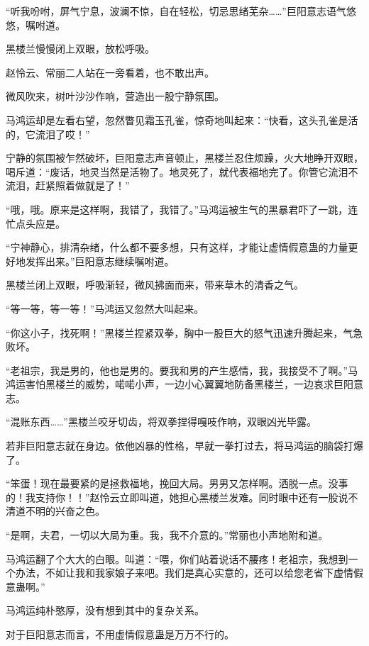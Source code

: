 
\begin{this_body}



“听我吩咐，屏气宁息，波澜不惊，自在轻松，切忌思绪芜杂……”巨阳意志语气悠悠，嘱咐道。

黑楼兰慢慢闭上双眼，放松呼吸。

赵怜云、常丽二人站在一旁看着，也不敢出声。

微风吹来，树叶沙沙作响，营造出一股宁静氛围。

马鸿运却是左看右望，忽然瞥见霜玉孔雀，惊奇地叫起来：“快看，这头孔雀是活的，它流泪了哎！”

宁静的氛围被乍然破坏，巨阳意志声音顿止，黑楼兰忍住烦躁，火大地睁开双眼，喝斥道：“废话，地灵当然是活物了。地灵死了，就代表福地完了。你管它流泪不流泪，赶紧照着做就是了！”

“哦，哦。原来是这样啊，我错了，我错了。”马鸿运被生气的黑暴君吓了一跳，连忙点头应是。

“宁神静心，排清杂绪，什么都不要多想，只有这样，才能让虚情假意蛊的力量更好地发挥出来。”巨阳意志继续嘱咐道。

黑楼兰闭上双眼，呼吸渐轻，微风拂面而来，带来草木的清香之气。

“等一等，等一等！”马鸿运又忽然大叫起来。

“你这小子，找死啊！”黑楼兰捏紧双拳，胸中一股巨大的怒气迅速升腾起来，气急败坏。

“老祖宗，我是男的，他也是男的。要我和男的产生感情，我，我接受不了啊。”马鸿运害怕黑楼兰的威势，喏喏小声，一边小心翼翼地防备黑楼兰，一边哀求巨阳意志。

“混账东西……”黑楼兰咬牙切齿，将双拳捏得嘎吱作响，双眼凶光毕露。

若非巨阳意志就在身边。依他凶暴的性格，早就一拳打过去，将马鸿运的脑袋打爆了。

“笨蛋！现在最要紧的是拯救福地，挽回大局。男男又怎样啊。洒脱一点。没事的！我支持你！！”赵怜云立即叫道，她担心黑楼兰发难。同时眼中还有一股说不清道不明的兴奋之色。

“是啊，夫君，一切以大局为重。我，我不介意的。”常丽也小声地附和道。

马鸿运翻了个大大的白眼。叫道：“喂，你们站着说话不腰疼！老祖宗，我想到一个办法，不如让我和我家娘子来吧。我们是真心实意的，还可以给您老省下虚情假意蛊啊。”

马鸿运纯朴憨厚，没有想到其中的复杂关系。

对于巨阳意志而言，不用虚情假意蛊是万万不行的。


\end{this_body}
